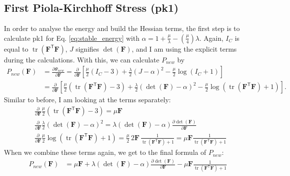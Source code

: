 {{{\subsection{First Piola-Kirchhoff Stress (\acrshort{pk1})}
In order to analyse the energy and build the Hessian terms, the first step is to calculate \acrshort{pk1} for Eq. \eqref{eq:stable_energy} with $\alpha=1+\frac{\mu}{\lambda}-\left(\frac{\mu}{4}\right)\lambda$. Again, $I_{C}$ is equal to $\operatorname{tr}(\mathbf{F}^\mathsf{T} \mathbf{F})$, $J$ signifies $\operatorname{det}(\mathbf{F})$, and I am using the explicit terms during the calculations. With this, we can calculate $P_{new}$ by
\begin{align*}
P_{new}(\mathbf{F}) &= \frac{\partial \Psi_{new}}{\partial \mathbf{F}} = \frac{\partial}{\partial \mathbf{F}} \left[ \frac{\mu}{2}\left(I_{C}-3\right) + \frac{\lambda}{2}(J-\alpha)^{2} - \frac{\mu}{2}\operatorname{log}\left(I_{C}+1\right) \right]
\\
&= \frac{\partial}{\partial \mathbf{F}} \left[ \frac{\mu}{2}\left(\operatorname{tr}(\mathbf{F}^\mathsf{T} \mathbf{F})-3\right) + \frac{\lambda}{2}(\operatorname{det}(\mathbf{F})-\alpha)^{2} - \frac{\mu}{2}\operatorname{log}\left(\operatorname{tr}(\mathbf{F}^\mathsf{T} \mathbf{F})+1\right) \right] .
\end{align*}
Similar to before, I am looking at the terms separately:
\begin{align*}
&\frac{\partial}{\partial \mathbf{F}} \frac{\mu}{2}\left(\operatorname{tr}(\mathbf{F}^\mathsf{T} \mathbf{F})-3\right) = \mu \mathbf{F}
\\
&\frac{\partial}{\partial \mathbf{F}} \frac{\lambda}{2}(\operatorname{det}(\mathbf{F})-\alpha)^{2} = \lambda (\operatorname{det}(\mathbf{F})-\alpha)  \frac{\partial \operatorname{det}(\mathbf{F})}{\partial \mathbf{F}} 
\\ 
&\frac{\partial}{\partial \mathbf{F}} \frac{\mu}{2}\operatorname{log}\left(\operatorname{tr}(\mathbf{F}^\mathsf{T} \mathbf{F})+1\right) = \frac{\mu}{2} \, 2 \mathbf{F} \, \frac{1}{\operatorname{tr}(\mathbf{F}^\mathsf{T} \mathbf{F}) + 1} = \mu \mathbf{F} \frac{1}{\operatorname{tr}(\mathbf{F}^\mathsf{T} \mathbf{F}) + 1}
\end{align*}
When we combine these terms again, we get to the final formula of $P_{new}$:
\begin{align*}
P_{new}(\mathbf{F}) &= \mu \mathbf{F} + \lambda (\operatorname{det}(\mathbf{F})-\alpha)  \frac{\partial \operatorname{det}(\mathbf{F})}{\partial \mathbf{F}} - \mu \mathbf{F} \frac{1}{\operatorname{tr}(\mathbf{F}^\mathsf{T} \mathbf{F}) + 1} \\

\end{align*}}}}
